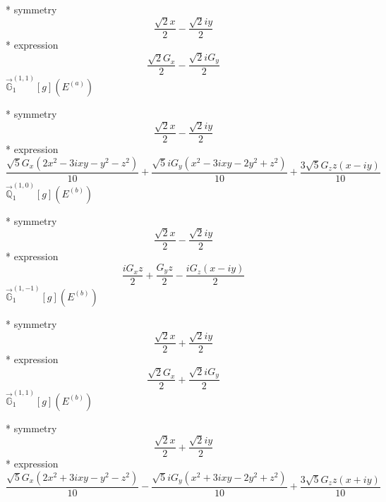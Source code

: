 \documentclass[fleqn,8pt]{jsarticle}
\begin{document}
\noindent\quad ** symmetry
\begin{dmath*}
\frac{\sqrt{2} x}{2} - \frac{\sqrt{2} i y}{2}
\end{dmath*}
\noindent\quad ** expression
\begin{dmath*}
\frac{\sqrt{2} G_{x}}{2} - \frac{\sqrt{2} i G_{y}}{2}
\end{dmath*}
\noindent\quad $\vec{\mathbb{G}}_{1}^{(1,1)}[g](E^{(a)})$

\noindent\quad ** symmetry
\begin{dmath*}
\frac{\sqrt{2} x}{2} - \frac{\sqrt{2} i y}{2}
\end{dmath*}
\noindent\quad ** expression
\begin{dmath*}
\frac{\sqrt{5} G_{x} \left(2 x^{2} - 3 i x y - y^{2} - z^{2}\right)}{10} + \frac{\sqrt{5} i G_{y} \left(x^{2} - 3 i x y - 2 y^{2} + z^{2}\right)}{10} + \frac{3 \sqrt{5} G_{z} z \left(x - i y\right)}{10}
\end{dmath*}
\noindent\quad $\vec{\mathbb{Q}}_{1}^{(1,0)}[g](E^{(b)})$

\noindent\quad ** symmetry
\begin{dmath*}
\frac{\sqrt{2} x}{2} - \frac{\sqrt{2} i y}{2}
\end{dmath*}
\noindent\quad ** expression
\begin{dmath*}
\frac{i G_{x} z}{2} + \frac{G_{y} z}{2} - \frac{i G_{z} \left(x - i y\right)}{2}
\end{dmath*}
\noindent\quad $\vec{\mathbb{G}}_{1}^{(1,-1)}[g](E^{(b)})$

\noindent\quad ** symmetry
\begin{dmath*}
\frac{\sqrt{2} x}{2} + \frac{\sqrt{2} i y}{2}
\end{dmath*}
\noindent\quad ** expression
\begin{dmath*}
\frac{\sqrt{2} G_{x}}{2} + \frac{\sqrt{2} i G_{y}}{2}
\end{dmath*}
\noindent\quad $\vec{\mathbb{G}}_{1}^{(1,1)}[g](E^{(b)})$

\noindent\quad ** symmetry
\begin{dmath*}
\frac{\sqrt{2} x}{2} + \frac{\sqrt{2} i y}{2}
\end{dmath*}
\noindent\quad ** expression
\begin{dmath*}
\frac{\sqrt{5} G_{x} \left(2 x^{2} + 3 i x y - y^{2} - z^{2}\right)}{10} - \frac{\sqrt{5} i G_{y} \left(x^{2} + 3 i x y - 2 y^{2} + z^{2}\right)}{10} + \frac{3 \sqrt{5} G_{z} z \left(x + i y\right)}{10}
\end{dmath*}
\end{document}
